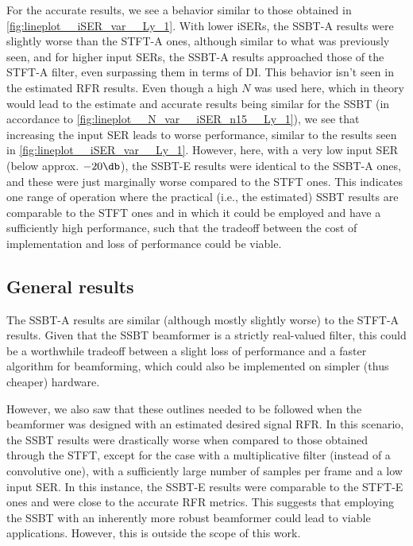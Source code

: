For the accurate results, we see a behavior similar to those obtained in \cref{fig:lineplot__iSER_var__Ly_1}. With lower iSERs, the SSBT-A results were slightly worse than the STFT-A ones, although similar to what was previously seen, and for higher input SERs, the SSBT-A results approached those of the STFT-A filter, even surpassing them in terms of DI. This behavior isn't seen in the estimated RFR results. Even though a high $N$ was used here, which in theory would lead to the estimate and accurate results being similar for the SSBT (in accordance to \cref{fig:lineplot__N_var__iSER_n15__Ly_1}), we see that increasing the input SER leads to worse performance, similar to the results seen in \cref{fig:lineplot__iSER_var__Ly_1}. However, here, with a very low input SER (below approx. $-20 \dB$), the SSBT-E results were identical to the SSBT-A ones, and these were just marginally worse compared to the STFT ones. This indicates one range of operation where the practical (i.e., the estimated) SSBT results are comparable to the STFT ones and in which it could be employed and have a sufficiently high performance, such that the tradeoff between the cost of implementation and loss of performance could be viable.


\subsection{General results}

The SSBT-A results are similar (although mostly slightly worse) to the STFT-A results. Given that the SSBT beamformer is a strictly real-valued filter, this could be a worthwhile tradeoff between a slight loss of performance and a faster algorithm for beamforming, which could also be implemented on simpler (thus cheaper) hardware.

However, we also saw that these outlines needed to be followed when the beamformer was designed with an estimated desired signal RFR. In this scenario, the SSBT results were drastically worse when compared to those obtained through the STFT, except for the case with a multiplicative filter (instead of a convolutive one), with a sufficiently large number of samples per frame and a low input SER. In this instance, the SSBT-E results were comparable to the STFT-E ones and were close to the accurate RFR metrics. This suggests that employing the SSBT with an inherently more robust beamformer could lead to viable applications. However, this is outside the scope of this work.
